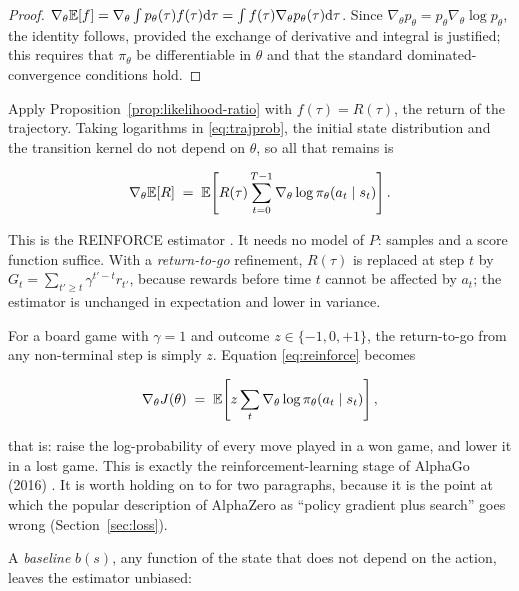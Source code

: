 \begin{proof}
$\nabla_\theta \mathbb{E}[f] = \nabla_\theta \int p_\theta(\tau) f(\tau) \mathrm{d}\tau
= \int f(\tau) \nabla_\theta p_\theta(\tau) \mathrm{d}\tau$. Since
$\nabla_\theta p_\theta = p_\theta \nabla_\theta \log p_\theta$, the identity
follows, provided the exchange of derivative and integral is justified; this
requires that $\pi_\theta$ be differentiable in $\theta$ and that the standard
dominated-convergence conditions hold.
\end{proof}

Apply Proposition~\ref{prop:likelihood-ratio} with $f(\tau) = R(\tau)$, the
return of the trajectory. Taking logarithms in \eqref{eq:trajprob}, the initial
state distribution and the transition kernel do not depend on $\theta$, so all
that remains is

\begin{equation}
\nabla_\theta \mathbb{E}[R] \;=\;
\mathbb{E}\!\left[ R(\tau) \sum_{t=0}^{T-1} \nabla_\theta \log \pi_\theta(a_t \mid s_t)
\right].
\label{eq:reinforce}
\end{equation}

This is the REINFORCE estimator \citep{williams1992reinforce}. It needs no
model of $P$: samples and a score function suffice. With a
\emph{return-to-go} refinement, $R(\tau)$ is replaced at step $t$ by
$G_t = \sum_{t'\ge t} \gamma^{t'-t} r_{t'}$, because rewards before time $t$
cannot be affected by $a_t$; the estimator is unchanged in expectation and
lower in variance.

For a board game with $\gamma = 1$ and outcome $z \in \{-1,0,+1\}$, the
return-to-go from any non-terminal step is simply $z$. Equation
\eqref{eq:reinforce} becomes

\begin{equation}
\nabla_\theta J(\theta) \;=\;
\mathbb{E}\!\left[ z \sum_{t} \nabla_\theta \log \pi_\theta(a_t \mid s_t) \right],
\label{eq:reinforce-game}
\end{equation}

that is: raise the log-probability of every move played in a won game, and
lower it in a lost game. This is exactly the reinforcement-learning stage of
AlphaGo (2016) \citep{silver2016alphago}. It is worth holding on to for two
paragraphs, because it is the point at which the popular description of
AlphaZero as ``policy gradient plus search'' goes wrong
(Section~\ref{sec:loss}).

A \emph{baseline} $b(s)$, any function of the state that does not depend on the
action, leaves the estimator unbiased:

